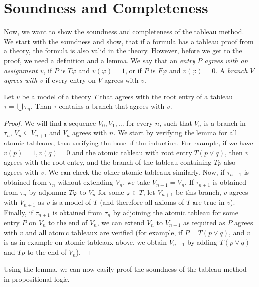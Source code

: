 \section{Soundness and Completeness}

Now, we want to show the soundness and completeness of the tableau method. We start with the soundness and show, that if a formula has a tableau proof from a theory, the formula is also valid in the theory. However, before we get to the proof, we need a definition and a lemma. We say that an \emph{entry $P$ agrees with an assignment $v$}, if $P$ is $T \varphi$ and $\bar{v}(\varphi) = 1$, or if $P$ is $F \varphi$ and $\bar{v}(\varphi) = 0$. A \emph{branch $V$ agrees with $v$} if every entry on $V$ agrees with $v$. 

\begin{lemma}
Let $v$ be a model of a theory $T$ that agrees with the root entry of a tableau $\tau = \bigcup \tau_n$. Than $\tau$ contains a branch that agrees with $v$.
\end{lemma}
\begin{proof}
We will find a sequence $V_0, V_1, \dots$ for every $n$, such that $V_n$ is a branch in $\tau_n$, $V_n \subseteq V_{n+1}$ and $V_n$ agrees with $n$. We start by verifying the lemma for all atomic tableaux, thus verifying the base of the induction. For example, if we have $v(p) = 1, v(q) = 0$ and the atomic tableau with root entry $T(p \lor q)$, then $v$ agrees with the root entry, and the branch of the tableau containing $Tp$ also agrees with $v$. We can check the other atomic tableaux similarly. Now, if $\tau_{n+1}$ is obtained from $\tau_n$ without extending $V_n$, we take $V_{n+1} = V_n$. If $\tau_{n+1}$ is obtained from $\tau_n$ by adjoining $T \varphi$ to $V_n$ for some $\varphi \in T$, let $V_{n+1}$ be this branch, $v$ agrees with $V_{n+1}$ as $v$ is a model of $T$ (and therefore all axioms of $T$ are true in $v$). Finally, if $\tau_{n+1}$ is obtained from $\tau_n$ by adjoining the atomic tableau for some entry $P$ on $V_n$ to the end of $V_n$, we can extend $V_n$ to $V_{n+1}$ as required as $P$ agrees with $v$ and all atomic tableaux are verified (for example, if $P = T(p\lor q)$, and $v$ is as in example on atomic tableaux above, we obtain $V_{n+1}$ by adding $T(p \lor q)$ and $Tp$ to the end of $V_n$).
\end{proof}

Using the lemma, we can now easily proof the soundness of the tableau method in propositional logic.

